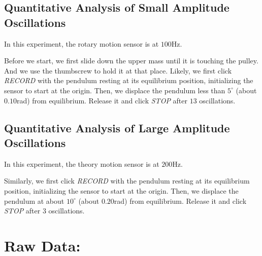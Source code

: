 \subsection{Quantitative Analysis of Small Amplitude Oscillations}
In this experiment, the rotary motion sensor is at $100$Hz.\par
Before we start, we first slide down the upper mass until it is touching the pulley. And we use the thumbscrew to hold it at that place. Likely, we first click \textit{RECORD} with the pendulum resting at its equilibrium position, initializing the sensor to start at the origin. Then, we displace the pendulum less than $5^\circ$ (about $0.10$rad) from equilibrium. Release it and click \textit{STOP} after $13$ oscillations.

\subsection{Quantitative Analysis of Large Amplitude Oscillations}
In this experiment, the theory motion sensor is at $200$Hz.\par
Similarly, we first click \textit{RECORD} with the pendulum resting at its equilibrium position, initializing the sensor to start at the origin. Then, we displace the pendulum at about $10^\circ$ (about $0.20$rad) from equilibrium. Release it and click \textit{STOP} after $3$ oscillations.

\section{Raw Data:}
